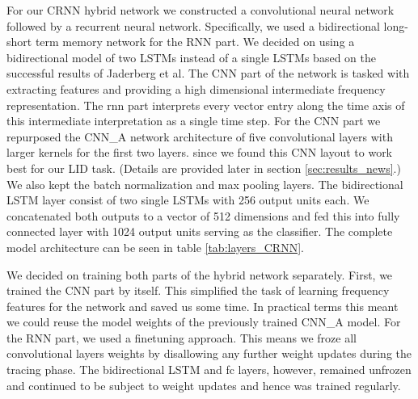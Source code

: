 For our CRNN hybrid network we constructed a convolutional neural network followed by a recurrent neural network. Specifically, we used a bidirectional long-short term memory network for the RNN part. We decided on using a bidirectional model of two LSTMs instead of a single LSTMs based on the successful results of Jaderberg et al. The CNN part of the network is tasked with extracting features and providing a high dimensional intermediate frequency representation. The \ac{rnn} part interprets every vector entry along the time axis of this intermediate interpretation as a single time step.
For the CNN part we repurposed the CNN\_A network architecture of five convolutional layers with larger kernels for the first two layers. since we found this CNN layout to work best for our LID task. (Details are provided later in section \ref{sec:results_news}.) We also kept the batch normalization and max pooling layers. The bidirectional LSTM layer consist of two single LSTMs with 256 output units each. We concatenated both outputs to a vector of 512 dimensions and fed this into fully connected layer with 1024 output units serving as the classifier. The complete model architecture can be seen in table \ref{tab:layers_CRNN}. 

We decided on training both parts of the hybrid network separately. First, we trained the CNN part by itself. This simplified the task of learning frequency features for the network and saved us some time. In practical terms this meant we could reuse the model weights of the previously trained CNN\_A model. For the RNN part, we used a finetuning approach. This means we froze all convolutional layers weights by disallowing any further weight updates during the tracing phase. The bidirectional LSTM and \ac{fc} layers, however, remained unfrozen and continued to be subject to weight updates and hence was trained regularly.

